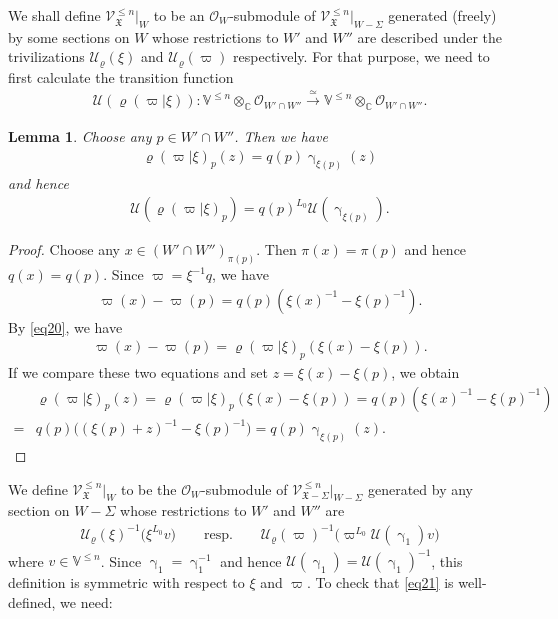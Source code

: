 \documentclass[11pt,b5paper,notitlepage]{article}
\theoremstyle{definition}
\theoremstyle{plain}
\newtheorem{lm}[df]{Lemma}
\newcommand{\fk}{\mathfrak}
\newcommand{\mc}{\mathcal}
\newcommand{\scr}{\mathscr}
\newcommand{\Vbb}{\mathbb V}
\newcommand{\Cbb}{\mathbb C}
\numberwithin{equation}{section}
\begin{document}
We shall define $\scr V^{\leq n}_{\fk X}|_{W}$ to be an $\scr O_{W}$-submodule of $\scr V_{\fk X}^{\leq n}|_{W-\Sigma}$ generated (freely) by some sections on $W$ whose restrictions to $W'$ and $W''$ are described under the trivilizations $\mc U_\varrho(\xi)$ and $\mc U_\varrho(\varpi)$ respectively. For that purpose, we need to first calculate the transition function \begin{align*}
\mc U(\varrho(\varpi|\xi)):\Vbb^{\leq n}\otimes_{\Cbb}\scr O_{W'\cap W''}\xrightarrow{\simeq} \Vbb^{\leq n}\otimes_{\Cbb}\scr O_{W'\cap W''}.
\end{align*}


\begin{lm}\label{lb7}
	Choose any $p\in W'\cap W''$. Then we have
	\begin{gather*}
	\varrho(\varpi|\xi)_p(z)=q(p)\upgamma_{\xi(p)}(z)
	\end{gather*}
	and hence
	\begin{align*}
	\mc U(\varrho(\varpi|\xi)_p)=q(p)^{L_0}\mc U(\upgamma_{\xi(p)}).
	\end{align*}
\end{lm}
\begin{proof}
	Choose any $x\in (W'\cap W'')_{\pi(p)}$. Then $\pi(x)=\pi(p)$ and hence $q(x)=q(p)$.  Since $\varpi=\xi^{-1}q$, we have
	\begin{align*}
	\varpi(x)-\varpi(p)=q(p)(\xi(x)^{-1}-\xi(p)^{-1}).
	\end{align*}
	By \eqref{eq20}, we have
	\begin{align*}
	\varpi(x)-\varpi(p)=\varrho(\varpi|\xi)_p(\xi(x)-\xi(p)).
	\end{align*}
	If we compare these two equations and set $z=\xi(x)-\xi(p)$, we obtain
	\begin{align*}
	&\varrho(\varpi|\xi)_p(z)=\varrho(\varpi|\xi)_p(\xi(x)-\xi(p))=q(p)(\xi(x)^{-1}-\xi(p)^{-1})\\
	=&q(p)\big((\xi(p)+z)^{-1}-\xi(p)^{-1} \big)=q(p)\upgamma_{\xi(p)}(z).
	\end{align*}
\end{proof}



We   define $\scr V_{\fk X}^{\leq n}|_{W}$ to be the  $\scr O_{W}$-submodule of $\scr V_{\fk X-\Sigma}^{\leq n}|_{W-\Sigma}$ generated by any section on $W-\Sigma$ whose restrictions to $W'$ and $W''$ are
\begin{align}
\boxed{~~\mc U_\varrho(\xi)^{-1}\big(\xi^{L_0}v\big)\qquad\text{resp.}\qquad \mc U_\varrho(\varpi)^{-1}\big(\varpi^{L_0}\mc U(\upgamma_1)v\big)  ~~}\label{eq21}
\end{align}
where $v\in\Vbb^{\leq n}$. Since $\upgamma_1=\upgamma_1^{-1}$ and hence $\mc U(\upgamma_1)=\mc U(\upgamma_1)^{-1}$, this definition is symmetric with respect to $\xi$ and $\varpi$. To check that \eqref{eq21} is well-defined, we need:
\end{document}
